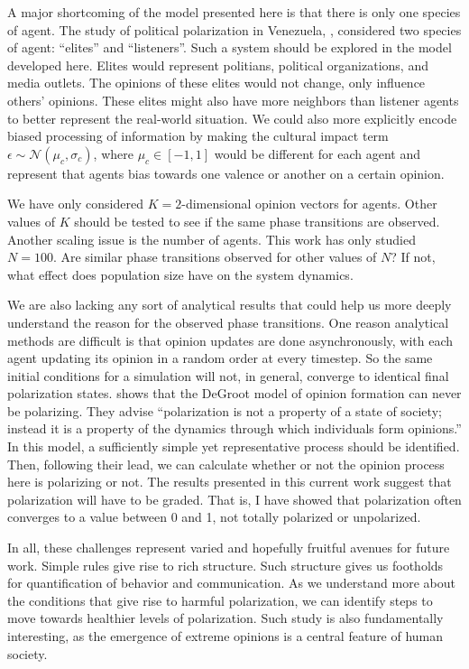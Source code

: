 \documentclass[11pt,letterpaper]{article}
\begin{document}
A major shortcoming of the model presented here is that there is only one 
species of agent. The study of political polarization in Venezuela, ,
considered two species of agent: ``elites'' and ``listeners''. Such a system
should be explored in the model developed here. Elites would represent 
politians, political organizations, and media outlets. The opinions of these
elites would not change, only influence others' opinions. These elites might also
have more neighbors than listener agents to better represent the real-world
situation. We could also more explicitly encode biased processing of information
by making the cultural impact term $\epsilon \sim \mathcal{N}(\mu_c, \sigma_c)$,
where $\mu_c \in [-1, 1]$ would be different for each agent and represent that agents
bias towards one valence or another on a certain opinion. 

We have only considered $K=2$-dimensional opinion vectors for agents. Other values of
$K$ should be tested to see if the same phase transitions are observed. Another
scaling issue is the number of agents. This work has only studied $N=100$. Are
similar phase transitions observed for other values of $N$? If not, what effect
does population size have on the system dynamics.

We are also lacking any sort of analytical results that could help us more 
deeply understand the reason for the observed phase transitions. One reason
analytical methods are difficult is that opinion updates are done asynchronously,
with each agent updating its opinion in a random order at every timestep. 
So the same initial conditions for a simulation will not, in general, converge
to identical final polarization states.  shows that the
DeGroot model of opinion formation can never be polarizing. They advise 
``polarization is not a property of a state of society; instead it is a 
property of the dynamics through which individuals form opinions.'' In this model,
a sufficiently simple yet representative process should be identified. Then,
following their lead, we can calculate whether or not the opinion process
here is polarizing or not. The results presented in this current work suggest
that polarization will have to be graded. That is, I have showed that polarization
often converges to a value between 0 and 1, not totally polarized or unpolarized.

In all, these challenges represent varied and hopefully fruitful avenues for
future work. Simple rules give rise to rich structure. Such structure gives us
footholds for quantification of behavior and communication. As we understand 
more about the conditions that give rise to harmful polarization, we can identify
steps to move towards healthier levels of polarization. Such study is also 
fundamentally interesting, as the emergence of extreme opinions is a central
feature of human society.

\newpage



\setlength{\bibleftmargin}{.125in}
\setlength{\bibindent}{-\bibleftmargin}


\end{document}
